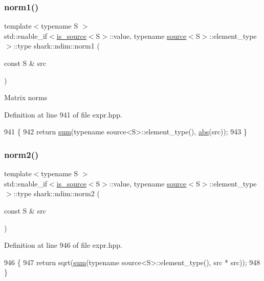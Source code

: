 \subsubsection{\texorpdfstring{norm1()}{norm1()}}
{\footnotesize\ttfamily template$<$typename S $>$ \\
std\+::enable\+\_\+if$<$\hyperlink{classshark_1_1ndim_1_1is__source}{is\+\_\+source}$<$S$>$\+::value, typename \hyperlink{structshark_1_1ndim_1_1source}{source}$<$S$>$\+::element\+\_\+type$>$\+::type shark\+::ndim\+::norm1 (\begin{DoxyParamCaption}\item[{const S \&}]{src }\end{DoxyParamCaption})}

Matrix norms 

Definition at line 941 of file expr.\+hpp.


\begin{DoxyCode}
941                                                                                                          \{
942             \textcolor{keywordflow}{return} \hyperlink{namespaceshark_1_1ndim_a864213068a08615fa12bdd67d83ed324}{sum}(\textcolor{keyword}{typename} source<S>::element\_type(), \hyperlink{namespaceshark_1_1ndim_a6ec5334c10df1824526954ad5a205531}{abs}(src));
943         \}
\end{DoxyCode}
\hypertarget{namespaceshark_1_1ndim_a006dcceb3ef3d3456fdb7214489cb15e}{}\label{namespaceshark_1_1ndim_a006dcceb3ef3d3456fdb7214489cb15e} 
\subsubsection{\texorpdfstring{norm2()}{norm2()}}
{\footnotesize\ttfamily template$<$typename S $>$ \\
std\+::enable\+\_\+if$<$\hyperlink{classshark_1_1ndim_1_1is__source}{is\+\_\+source}$<$S$>$\+::value, typename \hyperlink{structshark_1_1ndim_1_1source}{source}$<$S$>$\+::element\+\_\+type$>$\+::type shark\+::ndim\+::norm2 (\begin{DoxyParamCaption}\item[{const S \&}]{src }\end{DoxyParamCaption})}



Definition at line 946 of file expr.\+hpp.


\begin{DoxyCode}
946                                                                                                          \{
947             \textcolor{keywordflow}{return} sqrt(\hyperlink{namespaceshark_1_1ndim_a864213068a08615fa12bdd67d83ed324}{sum}(\textcolor{keyword}{typename} source<S>::element\_type(), src * src));
948         \}
\end{DoxyCode}
\hypertarget{namespaceshark_1_1ndim_ae642624dc61ac0881dbf0be36871006b}{}\label{namespaceshark_1_1ndim_ae642624dc61ac0881dbf0be36871006b} 
